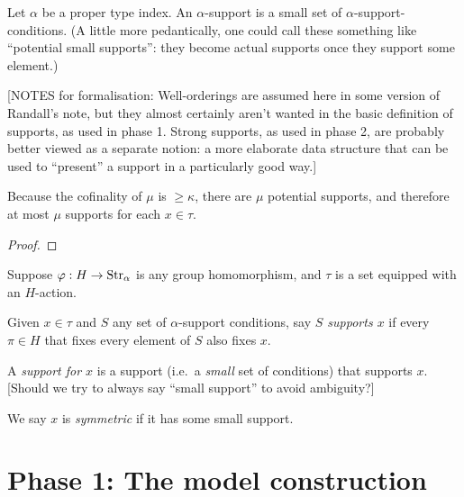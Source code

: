 \begin{definition}
\label{def:support}
\leanok
Let $\alpha$ be a proper type index. An $\alpha$-support is a small set of $\alpha$-support-conditions.  (A little more pedantically, one could call these something like “potential small supports”: they become actual supports once they support some element.)

[NOTES for formalisation: Well-orderings are assumed here in some version of Randall’s note, but they almost certainly aren’t wanted in the basic definition of supports, as used in phase 1. Strong supports, as used in phase 2, are probably better viewed as a separate notion: a more elaborate data structure that can be used to “present” a support in a particularly good way.]
\end{definition}

\begin{lemma}
\label {lem:count-supports}
\leanok
Because the cofinality of $\mu$ is $\geq \kappa$, there are $\mu$ potential supports, and therefore at most $\mu$ supports for each $x \in \tau$.
\end{lemma}
\begin{proof}
\leanok
\end{proof}

\begin{definition}
\label{def:support-of}
  \leanok
  Suppose $\varphi : H \to \mathrm{Str}_\alpha$ is any group homomorphism, and $\tau$ is a set equipped with an $H$-action.

  Given $x \in \tau$ and $S$ any set of $\alpha$-support conditions, say \emph{$S$ supports $x$} if every $\pi \in H$ that fixes every element of $S$ also fixes $x$.

  A \emph{support for $x$} is a support (i.e.\ a \emph{small} set of conditions) that supports $x$. [Should we try to always say “small support” to avoid ambiguity?]

  We say $x$ is \emph{symmetric} if it has some small support.
\end{definition}

\chapter{Phase 1: The model construction} \label{ch:model-construction}

